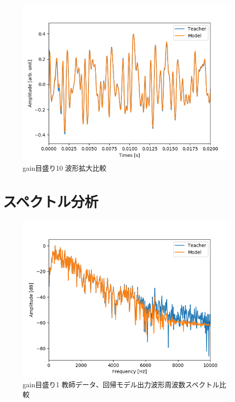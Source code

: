\documentclass{jreport}		%
\begin{document}
\begin{figure}[htbp]
 \begin{center}
  \includegraphics[width=150mm]{gain10_output_hikaku.png}
 \end{center}
 \caption{gain目盛り10 波形拡大比較}
 \label{fig:one}
\end{figure}

\clearpage
\section{スペクトル分析}

\begin{figure}[htbp]
 \begin{center}
  \includegraphics[width=150mm]{gain1_fft_hikaku.png}
 \end{center}
 \caption{gain目盛り1 教師データ、回帰モデル出力波形周波数スペクトル比較}
 \label{fig:one}
\end{figure}
\end{document}

